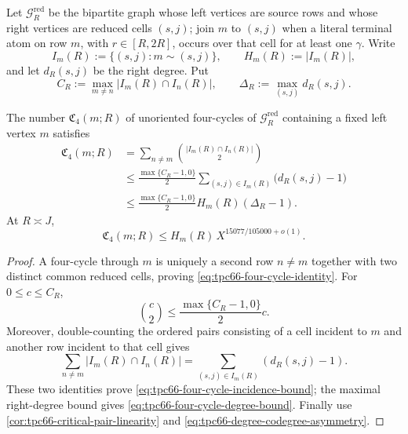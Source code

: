 Let \(\mathscr G_R^{\mathrm{red}}\) be the bipartite graph whose left
vertices are source rows and whose right vertices are reduced cells
\((s,j)\); join \(m\) to \((s,j)\) when a literal terminal atom on row
\(m\), with \(r\in[R,2R]\), occurs over that cell for at least one
\(\gamma\).  Write
\[
 I_m(R):=\{(s,j):m\sim(s,j)\},\qquad
 H_m(R):=|I_m(R)|,
 \]
and let \(d_R(s,j)\) be the right degree.  Put
\[
 C_R:=\max_{m\ne n}|I_m(R)\cap I_n(R)|,
 \qquad
 \Delta_R:=\max_{(s,j)}d_R(s,j).
 \]

\begin{corollary}
\label{cor:tpc66-four-cycle-bound}
The number \(\mathfrak C_4(m;R)\) of unoriented four-cycles of
\(\mathscr G_R^{\mathrm{red}}\) containing a fixed left vertex \(m\)
satisfies
\begin{align}
 \mathfrak C_4(m;R)
 &=
 \sum_{n\ne m}
 \binom{|I_m(R)\cap I_n(R)|}{2}
 \label{eq:tpc66-four-cycle-identity}\\
 &\le
 \frac{\max\{C_R-1,0\}}{2}
 \sum_{(s,j)\in I_m(R)}
 \bigl(d_R(s,j)-1\bigr)
 \label{eq:tpc66-four-cycle-incidence-bound}\\
 &\le
 \frac{\max\{C_R-1,0\}}{2}
 H_m(R)(\Delta_R-1).
 \label{eq:tpc66-four-cycle-degree-bound}
\end{align}
At \(R\asymp J\),
\begin{equation}
 \mathfrak C_4(m;R)
 \le
 H_m(R)\,
 X^{15077/105000+o(1)}.
 \label{eq:tpc66-critical-four-cycle-bound}
\end{equation}
\end{corollary}

\begin{proof}
A four-cycle through \(m\) is uniquely a second row \(n\ne m\) together
with two distinct common reduced cells, proving
\eqref{eq:tpc66-four-cycle-identity}.  For
\(0\le c\le C_R\),
\[
 \binom c2\le\frac{\max\{C_R-1,0\}}{2}c.
\]
Moreover, double-counting the ordered pairs consisting of a cell
incident to \(m\) and another row incident to that cell gives
\[
 \sum_{n\ne m}|I_m(R)\cap I_n(R)|
 =
 \sum_{(s,j)\in I_m(R)}(d_R(s,j)-1).
 \]
These two identities prove
\eqref{eq:tpc66-four-cycle-incidence-bound}; the maximal right-degree
bound gives \eqref{eq:tpc66-four-cycle-degree-bound}.  Finally use
\cref{cor:tpc66-critical-pair-linearity} and
\eqref{eq:tpc66-degree-codegree-asymmetry}.
\end{proof}

